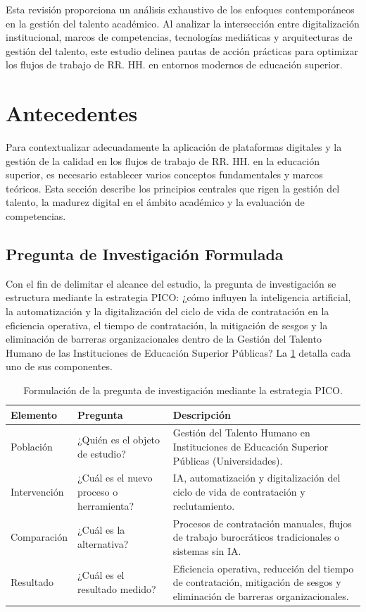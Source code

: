 \documentclass[conference]{IEEEtran}
\begin{document}
Esta revisión proporciona un análisis exhaustivo de los enfoques contemporáneos en la gestión del talento académico. Al analizar la intersección entre digitalización institucional, marcos de competencias, tecnologías mediáticas y arquitecturas de gestión del talento, este estudio delinea pautas de acción prácticas para optimizar los flujos de trabajo de RR. HH. en entornos modernos de educación superior.

\section{Antecedentes}

Para contextualizar adecuadamente la aplicación de plataformas digitales y la gestión de la calidad en los flujos de trabajo de RR. HH. en la educación superior, es necesario establecer varios conceptos fundamentales y marcos teóricos. Esta sección describe los principios centrales que rigen la gestión del talento, la madurez digital en el ámbito académico y la evaluación de competencias.

\subsection{Pregunta de Investigación Formulada}
\label{sec:pico}

Con el fin de delimitar el alcance del estudio, la pregunta de investigación se estructura mediante la estrategia PICO: ¿cómo influyen la inteligencia artificial, la automatización y la digitalización del ciclo de vida de contratación en la eficiencia operativa, el tiempo de contratación, la mitigación de sesgos y la eliminación de barreras organizacionales dentro de la Gestión del Talento Humano de las Instituciones de Educación Superior Públicas? La \cref{tab:pico} detalla cada uno de sus componentes.

\begin{table}[t]
\centering
\caption{Formulación de la pregunta de investigación mediante la estrategia PICO.}
\label{tab:pico}
\begin{tabular}{p{1.6cm}p{2.7cm}p{3.9cm}}
    \toprule
    \textbf{Elemento} & \textbf{Pregunta} & \textbf{Descripción} \\
    \midrule
    Población & ¿Quién es el objeto de estudio? & Gestión del Talento Humano en Instituciones de Educación Superior Públicas (Universidades). \\
    \addlinespace
    Intervención & ¿Cuál es el nuevo proceso o herramienta? & IA, automatización y digitalización del ciclo de vida de contratación y reclutamiento. \\
    \addlinespace
    Comparación & ¿Cuál es la alternativa? & Procesos de contratación manuales, flujos de trabajo burocráticos tradicionales o sistemas sin IA. \\
    \addlinespace
    Resultado & ¿Cuál es el resultado medido? & Eficiencia operativa, reducción del tiempo de contratación, mitigación de sesgos y eliminación de barreras organizacionales. \\
    \bottomrule
\end{tabular}
\end{table}
\end{document}
